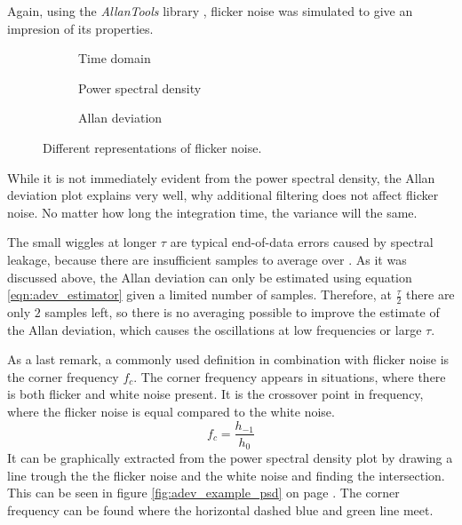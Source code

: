 Again, using the \textit{AllanTools} library \cite{allantools}, flicker noise was simulated to give an impresion of its properties.

\begin{figure}[ht]
    \centering
    \begin{subfigure}{0.32\linewidth}
        \centering
        \scalebox{0.75}{%
            
        } %
        \caption{Time domain}
        \label{fig:flicker_noise_time}
    \end{subfigure}
    \begin{subfigure}{0.32\linewidth}
        \centering
        \scalebox{0.75}{%
            
        } %
        \caption{Power spectral density}
        \label{fig:flicker_noise_psd}
    \end{subfigure}
    \begin{subfigure}{0.32\linewidth}
        \centering
        \scalebox{0.75}{%
            
        } %
        \caption{Allan deviation}
        \label{fig:flicker_noise_adev}
    \end{subfigure}
    \caption{Different representations of flicker noise.}
    \label{fig:flicker_noise_simulated}
\end{figure}

While it is not immediately evident from the power spectral density, the Allan deviation plot explains very well, why additional filtering does not affect flicker noise. No matter how long the integration time, the variance will the same.

The small wiggles at longer $\tau$ are typical end-of-data errors caused by spectral leakage, because there are insufficient samples to average over \cite{adev_long_tau}. As it was discussed above, the Allan deviation can only be estimated using equation \ref{eqn:adev_estimator} given a limited number of samples. Therefore, at $\frac{\tau}{2}$ there are only $2$ samples left, so there is no averaging possible to improve the estimate of the Allan deviation, which causes the oscillations at low frequencies or large $\tau$.

As a last remark, a commonly used definition in combination with flicker noise is the corner frequency $f_c$. The corner frequency appears in situations, where there is both flicker and white noise present. It is the crossover point in frequency, where the flicker noise is equal compared to the white noise.
\begin{equation}
    f_c = \frac{h_{-1}}{h_0} \label{eqn:corner_frequency}
\end{equation}
It can be graphically extracted from the power spectral density plot by drawing a line trough the the flicker noise and the white noise and finding the intersection. This can be seen in figure \ref{fig:adev_example_psd} on page \pageref{fig:adev_example_psd}. The corner frequency can be found where the horizontal dashed blue and green line meet.

